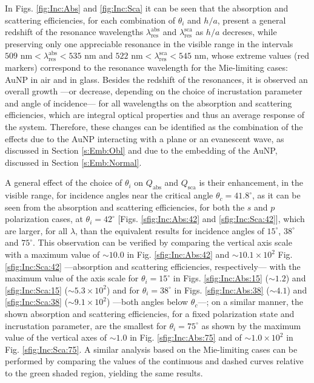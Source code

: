 In Figs. \ref{fig:Inc:Abs} and \ref{fig:Inc:Sca} it can be seen that the absorption and scattering efficiencies, for each combination of $\theta_i$ and $h/a$, present a general redshift of the resonance wavelengths $\lambda_\text{res}^\text{abs}$ and $\lambda_\text{res}^\text{sca}$ as $h/a$ decreses, while preserving only one appreciable resonance in the visible range in the intervals $509\text{ nm} < \lambda_\text{res}^\text{abs} < 535 \text{ nm}$ and  $522\text{ nm} < \lambda_\text{res}^\text{sca} < 545 \text{ nm}$, whose extreme values (red markers) correspond to the resonance wavelength for the Mie-limiting cases: AuNP in air and in glass. Besides the redshift of the resonances, it is observed an overall growth ---or decrease, depending on the choice of incrustation parameter and angle of incidence--- for all wavelengths on the absorption and scattering efficiencies, which are integral optical properties and thus an average response of the system. Therefore, these changes can be identified as the combination of the effects due to  the AuNP interacting with a plane or an evanescent wave, as discussed in Section \ref{s:Emb:Obl} and due to the embedding of the AuNP, discussed in Section \ref{s:Emb:Normal}.

A general effect of the choice of $\theta_i$ on $Q_\text{abs}$ and $Q_\text{sca}$ is their enhancement, in the visible range, for incidence angles near the critical angle $\theta_c = 41.8^\circ$, as it can be seen from the absorption and scattering efficiencies, for both the $s$ and $p$ polarization cases, at $\theta_i = 42^\circ$ [Figs. \ref{sfig:Inc:Abs:42} and \ref{sfig:Inc:Sca:42}], which are larger, for all $\lambda$, than the equivalent results for incidence angles of $15^\circ$, $38^\circ$ and $75^\circ$. This observation can be verified by comparing the vertical axis scale with a maximum value of $\sim 10.0$ in Fig. \ref{sfig:Inc:Abs:42} and  $\sim 10.1 \times 10^{2} $ Fig. \ref{sfig:Inc:Sca:42} ---absorption and scattering efficiencies, respectively--- with the maximum value of the axis scale for $\theta_i = 15^\circ$ in Figs. \ref{sfig:Inc:Abs:15} ($\sim 1.2$) and \ref{sfig:Inc:Sca:15} ($\sim 5.3 \times 10^{2}$) and for $\theta_i = 38^\circ$ in  Figs. \ref{sfig:Inc:Abs:38} ($\sim 4.1$) and \ref{sfig:Inc:Sca:38} ($\sim 9.1  \times 10^{2}$) ---both angles below $\theta_c$---; on a similar manner, the shown absorption and scattering efficiencies, for a fixed polarization state and incrustation parameter, are the smallest for $\theta_i = 75^\circ$ as shown by the maximum value of the vertical axes of $\sim 1.0$ in Fig. \ref{sfig:Inc:Abs:75} and of $\sim 1.0\times 10^2$ in Fig. \ref{sfig:Inc:Sca:75}. A similar analysis based on the Mie-limiting cases can be performed by comparing the values of the continuous and dashed curves relative to the green shaded region, yielding the same results.

